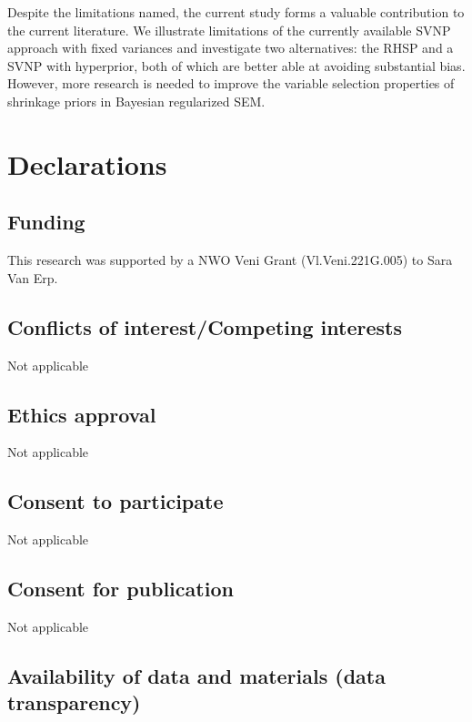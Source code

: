 \documentclass[
  man, donotrepeattitle,floatsintext]{apa6}
\begin{document}
Despite the limitations named, the current study forms a valuable
contribution to the current literature. We illustrate limitations of the currently available SVNP approach with fixed variances and investigate two alternatives: the RHSP and a SVNP with hyperprior, both of which are better able at avoiding substantial bias. However, more research is needed to improve the variable selection properties of shrinkage priors in Bayesian regularized SEM.

\clearpage

\section{Declarations}\label{declarations}

\subsection{Funding}\label{funding}

This research was supported by a NWO Veni Grant (Vl.Veni.221G.005) to Sara Van Erp.

\subsection{Conflicts of interest/Competing interests}\label{conflicts-of-interestcompeting-interests}

Not applicable

\subsection{Ethics approval}\label{ethics-approval}

Not applicable

\subsection{Consent to participate}\label{consent-to-participate}

Not applicable

\subsection{Consent for publication}\label{consent-for-publication}

Not applicable

\subsection{Availability of data and materials (data transparency)}\label{availability-of-data-and-materials-data-transparency}
\end{document}

